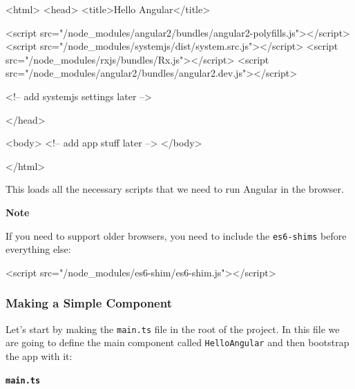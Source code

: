 \documentclass[12pt,]{article}
\newenvironment{Shaded}{}{}
\newcommand{\KeywordTok}[1]{\textcolor[rgb]{0.00,0.00,1.00}{{#1}}}
\newcommand{\StringTok}[1]{\textcolor[rgb]{0.00,0.50,0.50}{{#1}}}
\newcommand{\CommentTok}[1]{\textcolor[rgb]{0.00,0.50,0.00}{{#1}}}
\newcommand{\OtherTok}[1]{\textcolor[rgb]{1.00,0.25,0.00}{{#1}}}
\newcommand{\NormalTok}[1]{{#1}}
\begin{document}
\begin{Shaded}
\begin{Highlighting}[numbers=left,,]
\KeywordTok{<html>}
\KeywordTok{<head>}
  \KeywordTok{<title>}\NormalTok{Hello Angular}\KeywordTok{</title>}

  \KeywordTok{<script}\OtherTok{ src=}\StringTok{"/node_modules/angular2/bundles/angular2-polyfills.js"}\KeywordTok{></script>}
  \KeywordTok{<script}\OtherTok{ src=}\StringTok{"/node_modules/systemjs/dist/system.src.js"}\KeywordTok{></script>}
  \KeywordTok{<script}\OtherTok{ src=}\StringTok{"/node_modules/rxjs/bundles/Rx.js"}\KeywordTok{></script>}
  \KeywordTok{<script}\OtherTok{ src=}\StringTok{"/node_modules/angular2/bundles/angular2.dev.js"}\KeywordTok{></script>}

  \CommentTok{<!-- add systemjs settings later -->}

\KeywordTok{</head>}

\KeywordTok{<body>}
  \CommentTok{<!-- add app stuff later -->}
\KeywordTok{</body>}

\KeywordTok{</html>}
\end{Highlighting}
\end{Shaded}

This loads all the necessary scripts that we need to run Angular in the
browser.

\textbf{Note}

If you need to support older browsers, you need to include the
\texttt{es6-shims} before everything else:

\begin{Shaded}
\begin{Highlighting}[numbers=left,,]
\KeywordTok{<script}\OtherTok{ src=}\StringTok{"/node_modules/es6-shim/es6-shim.js"}\KeywordTok{></script>}
\end{Highlighting}
\end{Shaded}

\subsubsection{Making a Simple
Component}\label{making-a-simple-component}

Let's start by making the \texttt{main.ts} file in the root of the
project. In this file we are going to define the main component called
\texttt{HelloAngular} and then bootstrap the app with it:

\textbf{\texttt{main.ts}}
\end{document}
